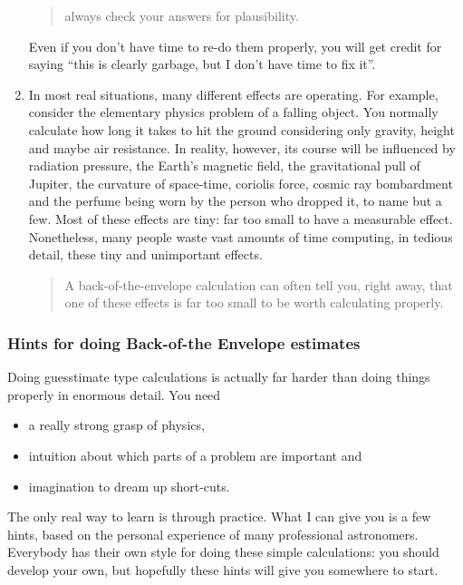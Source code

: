 \begin{enumerate}
%
\begin{quote}
always check your answers for plausibility. 
\end{quote}
%
Even if you don't have time to re-do them properly, you will get credit for saying ``this is clearly garbage, but I don't have time to fix it''.
%
\item In most real situations, many different effects are operating. For example, consider the elementary physics problem of a falling object. You normally calculate how long it takes to hit the ground considering only gravity, height and maybe air resistance. In reality, however, its course will be influenced by radiation pressure, the Earth's magnetic field, the gravitational pull of Jupiter, the curvature of space-time, coriolis force, cosmic ray bombardment and the perfume being worn by the person who dropped it, to name but a few. Most of these effects are tiny: far too small to have a measurable effect. Nonetheless, many people waste vast amounts of time computing, in tedious detail, these tiny and unimportant effects. 
%
\begin{quote}
A back-of-the-envelope calculation can often tell you, right away, that one of these effects is far too small to be worth calculating properly.
\end{quote}
%
\end{enumerate}


\subsubsection{Hints for doing Back-of-the Envelope estimates}
Doing guesstimate type calculations is actually far harder than doing things properly in enormous detail. You need 
\begin{itemize}
\item a really strong grasp of physics, 
\item intuition about which parts of a problem are important and 
\item imagination to dream up short-cuts.
\end{itemize} 
The only real way to learn is through practice. What I can give you is a few hints, based on the personal experience of many professional astronomers. Everybody has their own style for doing these simple calculations: you should develop your own, but hopefully these hints will give you somewhere to start.

